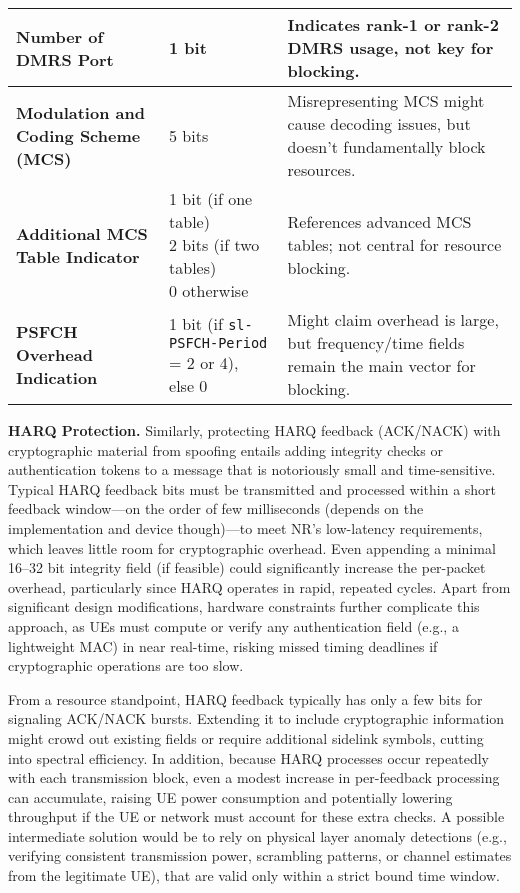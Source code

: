 \begin{table*}[!t]
\begin{tabularx}{\textwidth}{l l X}
\midrule

\textbf{Number of DMRS Port} &
1 bit &
Indicates rank-1 or rank-2 DMRS usage, not key for blocking. \\

\midrule

\textbf{Modulation and Coding Scheme (MCS)} &
5 bits &
Misrepresenting MCS might cause decoding issues, but doesn’t fundamentally block resources. \\

\midrule

\textbf{Additional MCS Table Indicator} &
\makecell[l]{1 bit (if one table) \\2 bits (if two tables) \\0 otherwise} &
References advanced MCS tables; not central for resource blocking. \\

\midrule

\textbf{PSFCH Overhead Indication} &
\makecell[l]{1 bit (if \texttt{sl-PSFCH-Period} = 2 or 4), \\ else 0} &
Might claim overhead is large, but frequency/time fields remain the main vector for blocking. \\

\bottomrule
\end{tabularx}
\end{table*}

\textbf{HARQ Protection.} Similarly, protecting HARQ feedback (ACK/NACK) with cryptographic material from spoofing entails adding integrity checks or authentication tokens to a message that is notoriously small and time-sensitive. Typical HARQ feedback bits must be transmitted and processed within a short feedback window—on the order of few milliseconds (depends on the implementation and device though)—to meet NR’s low-latency requirements, which leaves little room for cryptographic overhead. Even appending a minimal 16–32 bit integrity field (if feasible) could significantly increase the per-packet overhead, particularly since HARQ operates in rapid, repeated cycles. Apart from significant design modifications, hardware constraints further complicate this approach, as UEs must compute or verify any authentication field (e.g., a lightweight MAC) in near real-time, risking missed timing deadlines if cryptographic operations are too slow.

From a resource standpoint, HARQ feedback typically has only a few bits for signaling ACK/NACK bursts. Extending it to include cryptographic information might crowd out existing fields or require additional sidelink symbols, cutting into spectral efficiency. In addition, because HARQ processes occur repeatedly with each transmission block, even a modest increase in per-feedback processing can accumulate, raising UE power consumption and potentially lowering throughput if the UE or network must account for these extra checks. A possible intermediate solution would be to rely on physical layer anomaly detections (e.g., verifying consistent transmission power, scrambling patterns, or channel estimates from the legitimate UE), that are valid only within a strict bound time window. 

